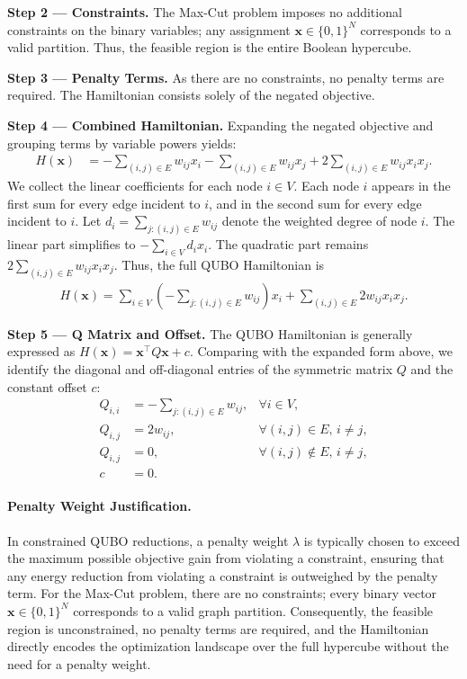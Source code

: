 \documentclass[12pt]{article}
\begin{document}
\textbf{Step 2 --- Constraints.} The Max-Cut problem imposes no additional constraints on the binary variables; any assignment $\mathbf{x} \in \{0,1\}^N$ corresponds to a valid partition. Thus, the feasible region is the entire Boolean hypercube.

\textbf{Step 3 --- Penalty Terms.} As there are no constraints, no penalty terms are required. The Hamiltonian consists solely of the negated objective.

\textbf{Step 4 --- Combined Hamiltonian.} Expanding the negated objective and grouping terms by variable powers yields:
\begin{align}
    H(\mathbf{x}) &= -\sum_{(i,j) \in E} w_{ij} x_i - \sum_{(i,j) \in E} w_{ij} x_j + 2\sum_{(i,j) \in E} w_{ij} x_i x_j.
\end{align}
We collect the linear coefficients for each node $i \in V$. Each node $i$ appears in the first sum for every edge incident to $i$, and in the second sum for every edge incident to $i$. Let $d_i = \sum_{j: (i,j) \in E} w_{ij}$ denote the weighted degree of node $i$. The linear part simplifies to $-\sum_{i \in V} d_i x_i$. The quadratic part remains $2\sum_{(i,j) \in E} w_{ij} x_i x_j$. Thus, the full QUBO Hamiltonian is
\begin{align}
    H(\mathbf{x}) = \sum_{i \in V} \left( -\sum_{j: (i,j) \in E} w_{ij} \right) x_i + \sum_{(i,j) \in E} 2w_{ij} x_i x_j.
\end{align}

\textbf{Step 5 --- Q Matrix and Offset.} The QUBO Hamiltonian is generally expressed as $H(\mathbf{x}) = \mathbf{x}^\top Q \mathbf{x} + c$. Comparing with the expanded form above, we identify the diagonal and off-diagonal entries of the symmetric matrix $Q$ and the constant offset $c$:
\begin{align}
    Q_{i,i} &= -\sum_{j: (i,j) \in E} w_{ij}, & \forall i \in V, \\
    Q_{i,j} &= 2w_{ij}, & \forall (i,j) \in E, \, i \neq j, \\
    Q_{i,j} &= 0, & \forall (i,j) \notin E, \, i \neq j, \\
    c &= 0.
\end{align}

\paragraph{Penalty Weight Justification.}
In constrained QUBO reductions, a penalty weight $\lambda$ is typically chosen to exceed the maximum possible objective gain from violating a constraint, ensuring that any energy reduction from violating a constraint is outweighed by the penalty term. For the Max-Cut problem, there are no constraints; every binary vector $\mathbf{x} \in \{0,1\}^N$ corresponds to a valid graph partition. Consequently, the feasible region is unconstrained, no penalty terms are required, and the Hamiltonian directly encodes the optimization landscape over the full hypercube without the need for a penalty weight.
\end{document}

